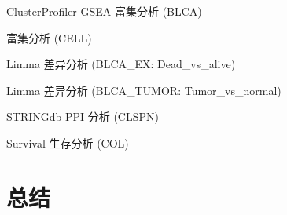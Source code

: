 \documentclass[
  ignorenonframetext,
]{beamer}
\begin{document}
\begin{frame}{ClusterProfiler GSEA 富集分析 (BLCA)}
\protect\hypertarget{clusterprofiler-gsea-ux5bccux96c6ux5206ux6790-blca}{}
\end{frame}

\begin{frame}{富集分析 (CELL)}
\protect\hypertarget{ux5bccux96c6ux5206ux6790-cell}{}
\end{frame}

\begin{frame}{Limma 差异分析 (BLCA\_EX: Dead\_vs\_alive)}
\protect\hypertarget{limma-ux5deeux5f02ux5206ux6790-blca_ex-dead_vs_alive}{}
\end{frame}

\begin{frame}{Limma 差异分析 (BLCA\_TUMOR: Tumor\_vs\_normal)}
\protect\hypertarget{limma-ux5deeux5f02ux5206ux6790-blca_tumor-tumor_vs_normal}{}
\end{frame}

\begin{frame}{STRINGdb PPI 分析 (CLSPN)}
\protect\hypertarget{stringdb-ppi-ux5206ux6790-clspn}{}
\end{frame}

\begin{frame}{Survival 生存分析 (COL)}
\protect\hypertarget{survival-ux751fux5b58ux5206ux6790-col}{}
\end{frame}

\hypertarget{conclusion}{%
\section{总结}\label{conclusion}}
\end{document}
